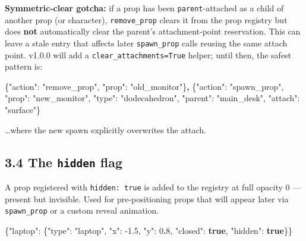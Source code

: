 \documentclass[
  12pt,
  letterpaper,
]{book}
\newenvironment{Shaded}{}{}
\newcommand{\DataTypeTok}[1]{\textcolor[rgb]{0.56,0.13,0.00}{#1}}
\newcommand{\DecValTok}[1]{\textcolor[rgb]{0.25,0.63,0.44}{#1}}
\newcommand{\ErrorTok}[1]{\textcolor[rgb]{1.00,0.00,0.00}{\textbf{#1}}}
\newcommand{\FloatTok}[1]{\textcolor[rgb]{0.25,0.63,0.44}{#1}}
\newcommand{\FunctionTok}[1]{\textcolor[rgb]{0.02,0.16,0.49}{#1}}
\newcommand{\KeywordTok}[1]{\textcolor[rgb]{0.00,0.44,0.13}{\textbf{#1}}}
\newcommand{\StringTok}[1]{\textcolor[rgb]{0.25,0.44,0.63}{#1}}
\begin{document}
\textbf{Symmetric-clear gotcha:} if a prop has been
\texttt{parent}-attached as a child of another prop (or character),
\texttt{remove\_prop} clears it from the prop registry but does
\textbf{not} automatically clear the parent's attachment-point
reservation. This can leave a stale entry that affects later
\texttt{spawn\_prop} calls reusing the same attach point. v1.0.0 will
add a \texttt{clear\_attachments=True} helper; until then, the safest
pattern is:

\begin{Shaded}
\begin{Highlighting}[]
\FunctionTok{\{}\DataTypeTok{"action"}\FunctionTok{:} \StringTok{"remove\_prop"}\FunctionTok{,} \DataTypeTok{"prop"}\FunctionTok{:} \StringTok{"old\_monitor"}\FunctionTok{\}}\ErrorTok{,}
\FunctionTok{\{}\DataTypeTok{"action"}\FunctionTok{:} \StringTok{"spawn\_prop"}\FunctionTok{,} \DataTypeTok{"prop"}\FunctionTok{:} \StringTok{"new\_monitor"}\FunctionTok{,}
 \DataTypeTok{"type"}\FunctionTok{:} \StringTok{"dodecahedron"}\FunctionTok{,}
 \DataTypeTok{"parent"}\FunctionTok{:} \StringTok{"main\_desk"}\FunctionTok{,} \DataTypeTok{"attach"}\FunctionTok{:} \StringTok{"surface"}\FunctionTok{\}}
\end{Highlighting}
\end{Shaded}

\ldots where the new spawn explicitly overwrites the attach.

\subsection{\texorpdfstring{3.4 The \texttt{hidden}
flag}{3.4 The hidden flag}}\label{the-hidden-flag-1}

A prop registered with \texttt{hidden:\ true} is added to the registry
at full opacity 0 --- present but invisible. Used for pre-positioning
props that will appear later via \texttt{spawn\_prop} or a custom reveal
animation.

\begin{Shaded}
\begin{Highlighting}[]
\FunctionTok{\{}\DataTypeTok{"laptop"}\FunctionTok{:} \FunctionTok{\{}\DataTypeTok{"type"}\FunctionTok{:} \StringTok{"laptop"}\FunctionTok{,} \DataTypeTok{"x"}\FunctionTok{:} \FloatTok{{-}1.5}\FunctionTok{,} \DataTypeTok{"y"}\FunctionTok{:} \DecValTok{0}\ErrorTok{.}\DecValTok{8}\FunctionTok{,}
            \DataTypeTok{"closed"}\FunctionTok{:} \KeywordTok{true}\FunctionTok{,} \DataTypeTok{"hidden"}\FunctionTok{:} \KeywordTok{true}\FunctionTok{\}\}}
\end{Highlighting}
\end{Shaded}
\end{document}

